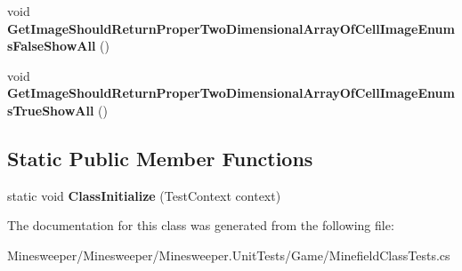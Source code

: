 \begin{DoxyCompactItemize}
\item 
\hypertarget{class_minesweeper_1_1_unit_tests_1_1_game_1_1_minefield_class_tests_af51b1f30a903fde456a6b258aab96a47}{void {\bfseries Get\+Image\+Should\+Return\+Proper\+Two\+Dimensional\+Array\+Of\+Cell\+Image\+Enums\+False\+Show\+All} ()}\label{class_minesweeper_1_1_unit_tests_1_1_game_1_1_minefield_class_tests_af51b1f30a903fde456a6b258aab96a47}

\item 
\hypertarget{class_minesweeper_1_1_unit_tests_1_1_game_1_1_minefield_class_tests_a9c6d456987ba9a68d4795361b58c63c9}{void {\bfseries Get\+Image\+Should\+Return\+Proper\+Two\+Dimensional\+Array\+Of\+Cell\+Image\+Enums\+True\+Show\+All} ()}\label{class_minesweeper_1_1_unit_tests_1_1_game_1_1_minefield_class_tests_a9c6d456987ba9a68d4795361b58c63c9}

\end{DoxyCompactItemize}
\subsection*{Static Public Member Functions}
\begin{DoxyCompactItemize}
\item 
\hypertarget{class_minesweeper_1_1_unit_tests_1_1_game_1_1_minefield_class_tests_a24435265c7ba64ddab0fd90e3d3e3ec0}{static void {\bfseries Class\+Initialize} (Test\+Context context)}\label{class_minesweeper_1_1_unit_tests_1_1_game_1_1_minefield_class_tests_a24435265c7ba64ddab0fd90e3d3e3ec0}

\end{DoxyCompactItemize}


The documentation for this class was generated from the following file\+:\begin{DoxyCompactItemize}
\item 
Minesweeper/\+Minesweeper/\+Minesweeper.\+Unit\+Tests/\+Game/Minefield\+Class\+Tests.\+cs\end{DoxyCompactItemize}
